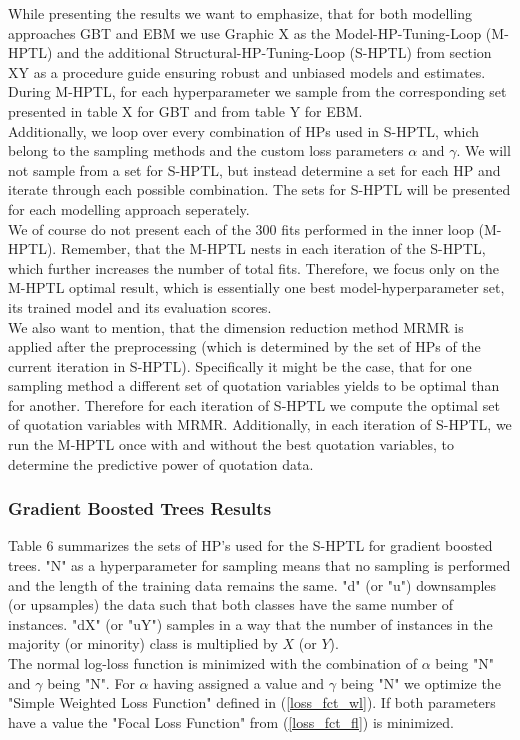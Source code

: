\documentclass[12pt,titlepage]{article}
\begin{document}
While presenting the results we want to emphasize, that for both modelling approaches GBT and EBM we use Graphic X as the Model-HP-Tuning-Loop (M-HPTL) and the additional Structural-HP-Tuning-Loop (S-HPTL) from section XY as a procedure guide ensuring robust and unbiased models and estimates. During M-HPTL, for each hyperparameter we sample from the corresponding set presented in table X for GBT and from table Y for EBM. \\
Additionally, we loop over every combination of HPs used in S-HPTL, which belong to the sampling methods and the custom loss parameters $\alpha$ and $\gamma$. We will not sample from a set for S-HPTL, but instead determine a set for each HP and iterate through each possible combination. The sets for S-HPTL will be presented for each modelling approach seperately. \\
We of course do not present each of the 300 fits performed in the inner loop (M-HPTL). Remember, that the M-HPTL nests in each iteration of the S-HPTL, which further increases the number of total fits. Therefore, we focus only on the M-HPTL optimal result, which is essentially one best model-hyperparameter set, its trained model and its evaluation scores. \\
We also want to mention, that the dimension reduction method MRMR is applied after the preprocessing (which is determined by the set of HPs of the current iteration in S-HPTL). Specifically it might be the case, that for one sampling method a different set of quotation variables yields to be optimal than for another. Therefore for each iteration of S-HPTL we compute the optimal set of quotation variables with MRMR. Additionally, in each iteration of S-HPTL, we run the M-HPTL once with and without the best quotation variables, to determine the predictive power of quotation data. \\

\subsubsection*{Gradient Boosted Trees Results}
Table 6 summarizes the sets of HP's used for the S-HPTL for gradient boosted trees. "N" as a hyperparameter for sampling means that no sampling is performed and the length of the training data remains the same. "d" (or "u") downsamples (or upsamples) the data such that both classes have the same number of instances. "dX" (or "uY") samples in a way that the number of instances in the majority (or minority) class is multiplied by $X$ (or $Y$). \\
The normal log-loss function is minimized with the combination of $\alpha$ being "N" and $\gamma$ being "N". For $\alpha$ having assigned a value and $\gamma$ being "N" we optimize the "Simple Weighted Loss Function" defined in (\ref{loss_fct_wl}). If both parameters have a value the "Focal Loss Function" from (\ref{loss_fct_fl}) is minimized. \\
\end{document}
